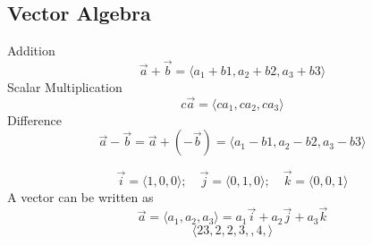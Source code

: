 \documentclass[twoside]{report}
\begin{document}
    \subsection{Vector Algebra}
    Addition
    \begin{equation}
        \vec{a} + \vec{b} = \langle a_{1} + b{1}, a_{2} + b{2}, a_{3} + b{3}\rangle
    \end{equation}
    Scalar Multiplication
    \begin{equation}
        c\vec{a} = \langle ca_{1}, ca_{2}, ca_{3}\rangle
    \end{equation}
    Difference
    \begin{equation}
        \vec{a} - \vec{b} = \vec{a} + (-\vec{b})  = \langle a_{1} - b{1}, a_{2} - b{2}, a_{3} - b{3}\rangle
    \end{equation}
    \begin{definition}
        \begin{equation}
            \vec{i} = \langle 1,0,0\rangle;\quad \vec{j} = \langle 0,1,0\rangle;\quad \vec{k} = \langle 0,0,1\rangle
        \end{equation}
        A vector can be written as
        \begin{equation}
            \vec{a} = \langle a_{1}, a_{2}, a_{3}\rangle = a_{1}\vec{i} + a_{2}\vec{j} + a_{3}\vec{k}
        \end{equation}
        \begin{equation}
            \langle 23,2,2,3,,4,\rangle
        \end{equation}
    \end{definition}
\end{document}
